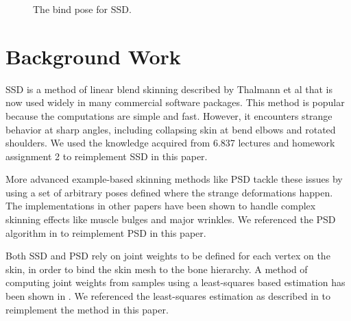 \documentclass[11pt,twocolumn,letterpaper]{article}
\begin{document}
\begin{figure}[t]
\begin{center}
\end{center}
   \caption{The bind pose for SSD.}
\label{fig:long}
\label{fig:onecol}
\label{bind}
\end{figure}

\section{Background Work}

SSD is a method of linear blend skinning described by Thalmann et al \cite{magnenat1988joint} that is now used widely in many commercial software packages. This method is popular because the computations are simple and fast. However, it encounters strange behavior at sharp angles, including collapsing skin at bend elbows and rotated shoulders. We used the knowledge acquired from 6.837 lectures and homework assignment 2 to reimplement SSD in this paper.

More advanced example-based skinning methods like PSD tackle these issues by using a set of arbitrary poses defined where the strange deformations happen. The implementations in other papers \cite{lewis2000pose, kurihara2004modeling} have been shown to handle complex skinning effects like muscle bulges and major wrinkles. We referenced the PSD algorithm in \cite{lewis2000pose, rhee2006real} to reimplement PSD in this paper.

Both SSD and PSD rely on joint weights to be defined for each vertex on the skin, in order to bind the skin mesh to the bone hierarchy. A method of computing joint weights from samples using a least-squares based estimation has been shown in \cite{wang2002multi, mohr2003direct}. We referenced the least-squares estimation as described in \cite{rhee2006real, wang2002multi, mohr2003direct} to reimplement the method in this paper.
\end{document}
